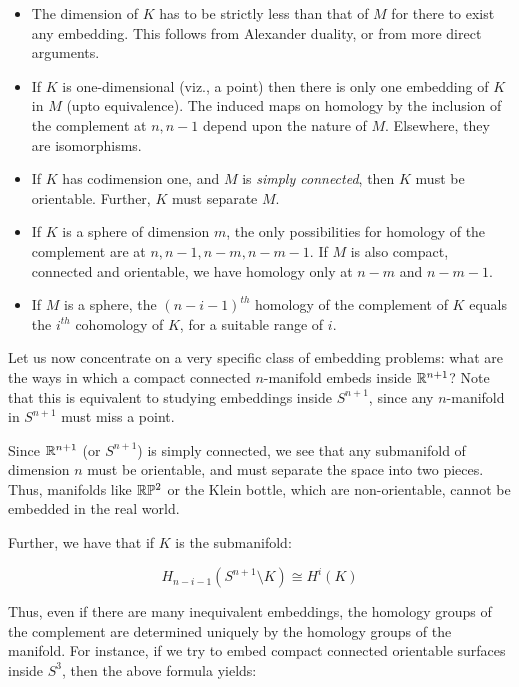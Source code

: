 \documentclass[a4paper]{amsart}
\begin{document}
\begin{itemize}

\item The dimension of $K$ has to be strictly less than that of $M$
  for there to exist any embedding. This follows from Alexander
  duality, or from more direct arguments.

\item If $K$ is one-dimensional (viz., a point) then there is only one
  embedding of $K$ in $M$ (upto equivalence). The induced maps on
  homology by the inclusion of the complement at $n,n-1$ depend upon
  the nature of $M$. Elsewhere, they are isomorphisms.

\item If $K$ has codimension one, and $M$ is {\em simply connected},
  then $K$ must be orientable. Further, $K$ must separate $M$.

\item If $K$ is a sphere of dimension $m$, the only possibilities for
  homology of the complement are at $n,n-1,n-m,n-m-1$. If $M$ is also
  compact, connected and orientable, we have homology only at $n-m$
  and $n-m-1$.

\item If $M$ is a sphere, the $(n-i-1)^{th}$ homology of the complement
  of $K$ equals the $i^{th}$ cohomology of $K$, for a suitable range
  of $i$.

\end{itemize}

Let us now concentrate on a very specific class of embedding problems:
what are the ways in which a compact connected $n$-manifold embeds
inside $\mathbb{R}^{n+1}$? Note that this is equivalent to studying embeddings
inside $S^{n+1}$, since any $n$-manifold in $S^{n+1}$ must miss a
point.

Since $\mathbb{R}^{n+1}$ (or $S^{n+1}$) is simply connected, we see that any
submanifold of dimension $n$ must be orientable, and must separate the
space into two pieces. Thus, manifolds like $\mathbb{R}\mathbb{P}^2$ or the
Klein bottle, which are non-orientable, cannot be embedded in the real
world.

Further, we have that if $K$ is the submanifold:

$$H_{n-i-1}(S^{n+1} \setminus K) \cong H^i(K)$$

Thus, even if there are many inequivalent embeddings, the homology
groups of the complement are determined uniquely by the homology
groups of the manifold. For instance, if we try to embed compact
connected orientable surfaces inside $S^3$, then the above formula
yields:
\end{document}
